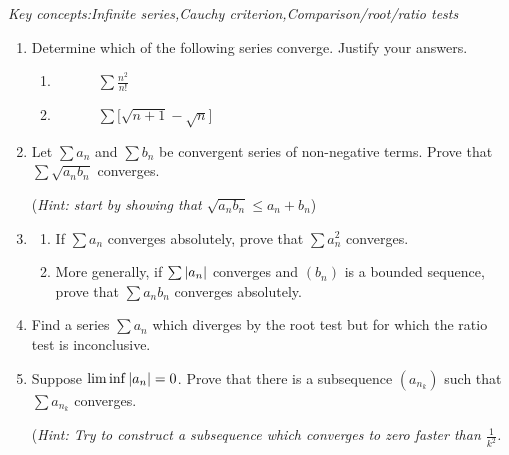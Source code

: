 \begin{exercises}{}{}
	\emph{Key concepts:\quad Infinite series,\quad Cauchy criterion,\quad Comparison/root/ratio tests}

	\begin{enumerate}
    \item%
		Determine which of the following series converge. Justify your answers.%
		\begin{enumerate}
			\item {} \  
			 \ 
			 \ 
			 \
			$\sum\frac{n^2}{n!}$
			\setcounter{enumii}{5}
			\item {} \ 
			 \ 
			 \
			 \
			$\sum \bigl[\sqrt{n+1}-\sqrt n\bigr]$
		\end{enumerate}
		
  
	  \item%
	  Let $\sum a_n$ and $\sum b_n$ be convergent series of non-negative terms. Prove that $\sum \sqrt{a_nb_n}$ converges.\par
	  (\emph{Hint: start by showing that $\sqrt{a_nb_n}\le a_n+b_n$})
	  
  
	  \item%
	  \label{exs:seriesmult}
	  \begin{enumerate}
	    \item If $\sum a_n$ converges absolutely, prove that $\sum a_n^2$ converges.
	    \item More generally, if $\sum\left| a_n\right|$ converges and $(b_n)$ is a bounded sequence, prove that $\sum a_nb_n$ converges absolutely.
	  \end{enumerate}
	  
	  
	  \item%
		Find a series $\sum a_n$ which diverges by the root test but for which the ratio test is inconclusive.
	  
	  
	  \item%
	  Suppose $\liminf\left| a_n\right|=0$. Prove that there is a subsequence $(a_{n_k})$ such that $\sum a_{n_k}$ converges.\par
	  (\emph{Hint: Try to construct a subsequence which converges to zero faster than $\frac 1{k^2}$.}
	  

\end{enumerate}
\end{exercises}
